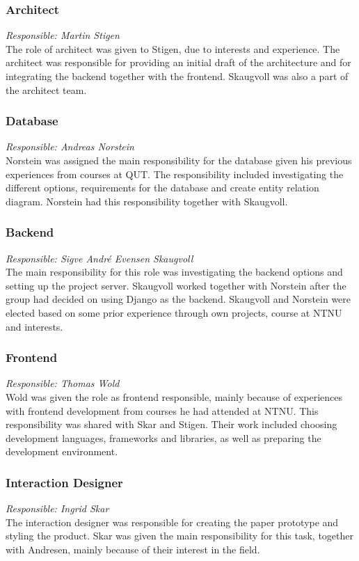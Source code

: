 \subsubsection{Architect}
\textit{Responsible: Martin Stigen} \\
The role of architect was given to Stigen, due to interests and experience. The architect was responsible for providing an initial draft of the architecture and for integrating the backend together with the frontend. Skaugvoll was also a part of the architect team.

\subsubsection{Database}
\textit{Responsible: Andreas Norstein}\\
Norstein was assigned the main responsibility for the database given his previous experiences from courses at QUT. The responsibility included investigating the different options, requirements for the database and create entity relation diagram. Norstein had this responsibility together with Skaugvoll.

\subsubsection{Backend}
\textit{Responsible: Sigve André Evensen Skaugvoll}\\
The main responsibility for this role was investigating the backend options and setting up the project server. Skaugvoll worked together with Norstein after the group had decided on using Django as the backend. Skaugvoll and Norstein were elected based on some prior experience through own projects, course at NTNU and interests.

\subsubsection{Frontend}
\textit{Responsible: Thomas Wold}\\
Wold was given the role as frontend responsible, mainly because of experiences with frontend development from courses he had attended at NTNU. This responsibility was shared with Skar and Stigen. Their work included choosing development languages, frameworks and libraries, as well as preparing the development environment.

\subsubsection{Interaction Designer}
\textit{Responsible: Ingrid Skar}\\
The interaction designer was responsible for creating the paper prototype and styling the product. Skar was given the main responsibility for this task, together with Andresen, mainly because of their interest in the field.

